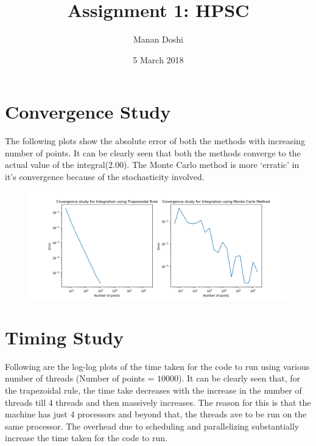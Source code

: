 \documentclass{article}
\title{Assignment 1: HPSC}
\author{Manan Doshi}
\date{5 March 2018}
\begin{document}
\graphicspath{{/}}
\maketitle

\section{Convergence Study}
The following plots show the absolute error of both the methods with increasing number of points. It can be clearly seen that both the methods converge to the actual value of the integral(2.00). The Monte Carlo method is more `erratic' in it's convergence because of the stochasticity involved.

\begin{figure}[h!]
\centering
\includegraphics[scale=0.5]{conv}
\end{figure}

\newpage
\section{Timing Study}

Following are the log-log plots of the time taken for the code to run using various number of threads (Number of points = $10000$). It can be clearly seen that, for the trapezoidal rule, the time take decreases with the increase in the number of threads till 4 threads and then massively increases. The reason for this is that the machine has just $4$ processors and beyond that, the threads ave to be run on the same processor. The overhead due to scheduling and parallelizing substantially increase the time taken for the code to run.
\end{document}
